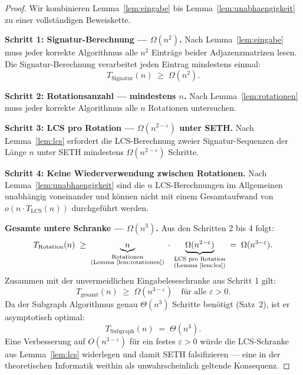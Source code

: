 \documentclass[a4paper,12pt]{article}
\theoremstyle{definition}
\begin{document}
\begin{proof}
Wir kombinieren Lemma~\ref{lem:eingabe} bis Lemma~\ref{lem:unabhaengigkeit} zu einer vollständigen Beweiskette.

\textbf{Schritt 1: Signatur-Berechnung — $\Omega(n^2)$.}
Nach Lemma~\ref{lem:eingabe} muss jeder korrekte Algorithmus alle $n^2$ Einträge beider Adjazenzmatrizen lesen.
Die Signatur-Berechnung verarbeitet jeden Eintrag mindestens einmal:
\[
	T_{\text{Signatur}}(n) \;\geq\; \Omega(n^2).
\]

\textbf{Schritt 2: Rotationsanzahl — mindestens $n$.}
Nach Lemma~\ref{lem:rotationen} muss jeder korrekte Algorithmus alle $n$ Rotationen untersuchen.

\textbf{Schritt 3: LCS pro Rotation — $\Omega(n^{2-\varepsilon})$ unter SETH.}
Nach Lemma~\ref{lem:lcs} erfordert die LCS-Berechnung zweier Signatur-Sequenzen der Länge $n$
unter SETH mindestens $\Omega(n^{2-\varepsilon})$ Schritte.

\textbf{Schritt 4: Keine Wiederverwendung zwischen Rotationen.}
Nach Lemma~\ref{lem:unabhaengigkeit} sind die $n$ LCS-Berechnungen im Allgemeinen
unabhängig voneinander und können nicht mit einem Gesamtaufwand von $o(n \cdot T_{\mathrm{LCS}}(n))$ durchgeführt werden.

\textbf{Gesamte untere Schranke — $\Omega(n^3)$.}
Aus den Schritten 2 bis 4 folgt:
\[
	T_{\text{Rotation}}(n)
	\;\geq\;
	\underbrace{n}_{\substack{\text{Rotationen}\\\text{(Lemma \ref{lem:rotationen})}}}
	\;\cdot\;
	\underbrace{\Omega(n^{2-\varepsilon})}_{\substack{\text{LCS pro Rotation}\\\text{(Lemma \ref{lem:lcs})}}}
	\;=\; \Omega(n^{3-\varepsilon}).
\]
Zusammen mit der unvermeidlichen Eingabeleseschranke aus Schritt 1 gilt:
\[
	T_{\text{gesamt}}(n) \;\geq\; \Omega(n^{3-\varepsilon}) \quad \text{für alle } \varepsilon > 0.
\]
Da der Subgraph Algorithmus genau $\Theta(n^3)$ Schritte benötigt (Satz~2), ist er asymptotisch optimal:
\[
	T_{\text{Subgraph}}(n) \;=\; \Theta(n^3).
\]
Eine Verbesserung auf $O(n^{3-\varepsilon})$ für ein festes $\varepsilon > 0$ würde die LCS-Schranke aus Lemma~\ref{lem:lcs} widerlegen und damit SETH falsifizieren — eine in der theoretischen Informatik weithin als unwahrscheinlich geltende Konsequenz.
\end{proof}
\end{document}
